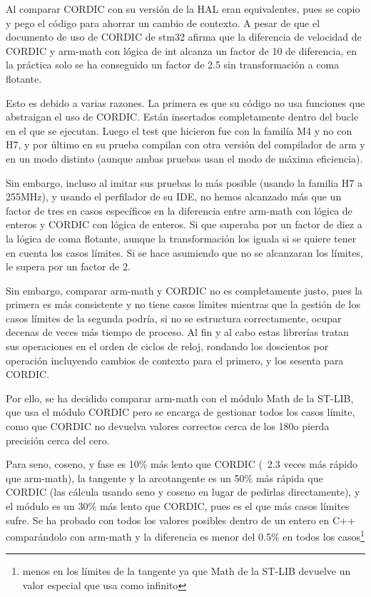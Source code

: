 \documentclass{report}
\begin{document}
Al comparar CORDIC con su versión de la HAL eran equivalentes, pues se copio y pego el código para ahorrar un cambio de contexto. A pesar de que el documento de uso de CORDIC de stm32\cite{web:stm32:CORDIC} afirma que la diferencia de velocidad de CORDIC y arm-math con lógica de int alcanza un factor de 10 de diferencia, en la práctica solo se ha conseguido un factor de 2.5 sin transformación a coma flotante.  
\par
Esto es debido a varias razones. La primera es que su código no usa funciones que abstraigan el uso de CORDIC. Están insertados completamente dentro del bucle en el que se ejecutan. Luego el test que hicieron fue con la familía M4 y no con H7, y por último en su prueba compilan con otra versión del compilador de arm y en un modo distinto (aunque ambas pruebas usan el modo de máxima eficiencia). \par
Sin embargo, incluso al imitar sus pruebas lo más posible (usando la familia H7 a 255MHz), y usando el perfilador de su IDE, no hemos alcanzado más que un factor de tres en casos específicos en la diferencia entre arm-math con lógica de enteros y CORDIC con lógica de enteros. Si que superaba por un factor de diez a la lógica de coma flotante, aunque la transformación los iguala si se quiere tener en cuenta los casos límites. Si se hace asumiendo que no se alcanzaran los límites, le supera por un factor de 2.
\par \vspace{0.3cm}
Sin embargo, comparar arm-math y CORDIC no es completamente justo, pues la primera es más consistente y no tiene casos límites mientras que la gestión de los casos límites de la segunda podría, si no se estructura correctamente, ocupar decenas de veces más tiempo de proceso. Al fin y al cabo estas librerías tratan sus operaciones en el orden de ciclos de reloj, rondando los doscientos por operación incluyendo cambios de contexto para el primero, y los sesenta para CORDIC. 
\par 
Por ello, se ha decidido comparar arm-math con el módulo Math de la ST-LIB, que usa el módulo CORDIC pero se encarga de gestionar todos los casos límite, como que CORDIC no devuelva valores correctos cerca de los 180\textdegree o pierda precisión cerca del cero. 
\par
Para seno, coseno, y fase es 10\% más lento que CORDIC (~2.3 veces más rápido que arm-math), la tangente y la arcotangente es un 50\% más rápida que CORDIC (las cálcula usando seno y coseno en lugar de pedirlas directamente), y el módulo es un 30\% más lento que CORDIC, pues es el que más casos límites sufre. Se ha probado con todos los valores posibles dentro de un entero en C++ comparándolo con arm-math y la diferencia es menor del 0.5\% en todos los casos\footnote{menos en los límites de la tangente ya que Math de la ST-LIB devuelve un valor especial que usa como infinito}
\end{document}

